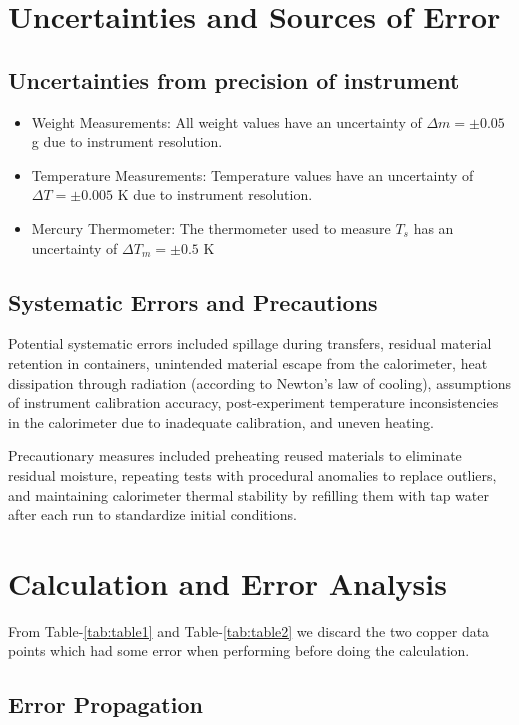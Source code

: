 \documentclass[%
 sor,
 jor,
 amsmath,amssymb,
 reprint,%
]{revtex4-2}
\begin{document}
\section{Uncertainties and Sources of Error}
\subsection{Uncertainties from precision of instrument}
\begin{itemize}
    \item Weight Measurements:
    All weight values have an uncertainty of $\Delta m = \pm 0.05$ \si{\gram} due to instrument resolution.    
    \item Temperature Measurements: Temperature values have an uncertainty of $\Delta T = \pm 0.005$ \si{\kelvin} due to instrument resolution. 
\item Mercury Thermometer: The thermometer used to measure $T_s$ has an uncertainty of $\Delta T_m = \pm 0.5$ \si{\kelvin}
\end{itemize}

\subsection{Systematic Errors and Precautions}  
Potential systematic errors included spillage during transfers, residual material retention in containers, unintended material escape from the calorimeter, heat dissipation through radiation (according to Newton's law of cooling), assumptions of instrument calibration accuracy, post-experiment temperature inconsistencies in the calorimeter due to inadequate calibration, and uneven heating.  

Precautionary measures included preheating reused materials to eliminate residual moisture, repeating tests with procedural anomalies to replace outliers, and maintaining calorimeter thermal stability by refilling them with tap water after each run to standardize initial conditions.


\section{Calculation and Error Analysis}
From Table-\ref{tab:table1} and Table-{\ref{tab:table2}} we discard the two copper data points which had some error when performing before doing the calculation. 
\subsection{Error Propagation}
\end{document}
